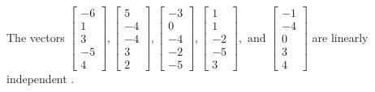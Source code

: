 \begin{exercise}
\begin{exerciseStatement}
  \end{exerciseStatement}
  \begin{exerciseAnswer}
   The vectors \(\left[\begin{array}{r}
-6 \\
1 \\
3 \\
-5 \\
4
\end{array}\right] , \left[\begin{array}{r}
5 \\
-4 \\
-4 \\
3 \\
2
\end{array}\right] , \left[\begin{array}{r}
-3 \\
0 \\
-4 \\
-2 \\
-5
\end{array}\right] , \left[\begin{array}{r}
1 \\
1 \\
-2 \\
-5 \\
3
\end{array}\right] , \text{ and } \left[\begin{array}{r}
-1 \\
-4 \\
0 \\
3 \\
4
\end{array}\right]\) are 
  	 linearly independent  .
  


  \end{exerciseAnswer}
\end{exercise}